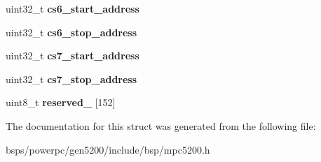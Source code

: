 \begin{DoxyCompactItemize}
\mbox{\label{structmpc5200__mm_aa66636bf2fdfa7b64745f4f49be72780}} 
uint32\+\_\+t {\bfseries cs6\+\_\+start\+\_\+address}
\item 
\mbox{\label{structmpc5200__mm_ae42c60b765e96979a496082aec1c3180}} 
uint32\+\_\+t {\bfseries cs6\+\_\+stop\+\_\+address}
\item 
\mbox{\label{structmpc5200__mm_aadcca581fefc8eefe53104dc67996fd8}} 
uint32\+\_\+t {\bfseries cs7\+\_\+start\+\_\+address}
\item 
\mbox{\label{structmpc5200__mm_a6c6e6117207b03bd7b8b11796dd0b4e2}} 
uint32\+\_\+t {\bfseries cs7\+\_\+stop\+\_\+address}
\item 
\mbox{\label{structmpc5200__mm_a6b90144b57434f0c1a9d3d25a5ba1c8c}} 
uint8\+\_\+t {\bfseries reserved\+\_} \mbox{[}152\mbox{]}
\end{DoxyCompactItemize}


The documentation for this struct was generated from the following file\+:\begin{DoxyCompactItemize}
\item 
bsps/powerpc/gen5200/include/bsp/mpc5200.\+h\end{DoxyCompactItemize}
